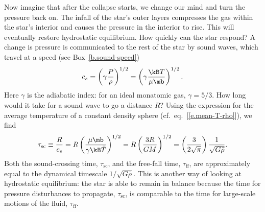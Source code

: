 Now imagine that after the collapse starts, we change our mind and turn the pressure back on. The infall of the star's outer layers compresses the gas within the star's interior and causes the pressure in the interior to rise. This will eventually restore hydrostatic equilibrium. How quickly can the star respond? A change is pressure is communicated to the rest of the star by sound waves, which travel at a speed (see Box~\ref{b.sound-speed})
\begin{equation}\label{e.speed-of-sound}
c_{s} = \left(\gamma\frac{P}{\rho}\right)^{1/2}
	= \left(\gamma\frac{\kB T}{\mu\mb}\right)^{1/2}.
\end{equation}
Here $\gamma$ is the adiabatic index: for an ideal monatomic gas, $\gamma = 5/3$.  How long would it take for a sound wave to go a distance $R$?  Using the expression for the average temperature of a constant density sphere (cf.~eq.~[\ref{e.mean-T-rho}]), we find
\[
	\tau_{\mathrm{sc}} \equiv \frac{R}{c_{s}} = R\left(\frac{\mu\mb}{\gamma\kB \bar{T}}\right)^{1/2} = R\left(\frac{3R}{GM}\right)^{1/2}
		= \left(\frac{3}{2\sqrt{\pi}}\right)\frac{1}{\sqrt{G\bar{\rho}}}.
\]
Both the sound-crossing time, $\tau_{\mathrm{sc}}$, and the free-fall time, $\tau_{\mathrm{ff}}$, are approximately equal to the dynamical timescale $1/\sqrt{G\bar{\rho}}$.  This is another way of looking at hydrostatic equilibrium: the star is able to remain in balance because the time for pressure disturbances to propagate, $\tau_{\mathrm{sc}}$, is comparable to the time for large-scale motions of the fluid, $\tau_{\mathrm{ff}}$.

